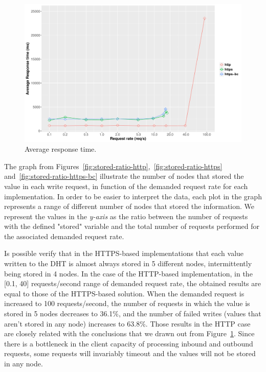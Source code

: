 \begin{figure}[htb]
  \centering
  \includegraphics[scale=0.4]{Figures/evaluation/average-response-time.pdf}
  \caption{Average response time.}
  \label{fig:average-response-time}
\end{figure}


The graph from Figures~\ref{fig:stored-ratio-http},~\ref{fig:stored-ratio-https} and~\ref{fig:stored-ratio-https-bc} illustrate the number of nodes that stored the value in each write request, in function of the demanded request rate for each implementation.
In order to be easier to interpret the data, each plot in the graph represents a range of different number of nodes that stored the information.
We represent the values in the \textit{y-axis} as the ratio between the number of requests with the defined "stored" variable and the total number of requests performed for the associated demanded request rate.

Is possible verify that in the HTTPS-based implementations that each value written to the DHT is almost always stored in 5 different nodes, intermittently being stored in 4 nodes.
In the case of the HTTP-based implementation, in the [0.1, 40] requests/second range of demanded request rate, the obtained results are equal to those of the HTTPS-based solution.
When the demanded request is increased to 100 requests/second, the number of requests in which the value is stored in 5 nodes decreases to 36.1\%, and the number of failed writes (values that aren't stored in any node) increases to 63.8\%.
Those results in the HTTP case are closely related with the conclusions that we drawn out from Figure~\ref{fig:average-response-time}.
Since there is a bottleneck in the client capacity of processing inbound and outbound requests, some requests will invariably timeout and the values will not be stored in any node.


